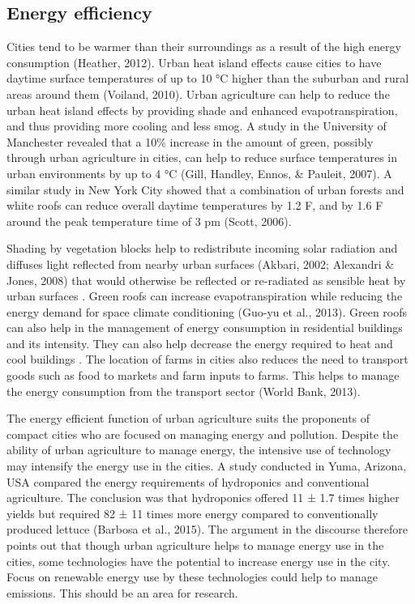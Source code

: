 \subsection{Energy efficiency}

Cities tend to be warmer than their surroundings as a result of the high energy consumption (Heather, 2012). Urban heat island effects cause cities to have daytime surface temperatures of up to 10 °C higher than the suburban and rural areas around them (Voiland, 2010). Urban agriculture can help to reduce the urban heat island effects by providing shade and enhanced evapotranspiration, and thus providing more cooling and less smog. A study in the University of Manchester revealed that a 10\% increase in the amount of green, possibly through urban agriculture in cities, can help to reduce surface temperatures in urban environments by up to 4 °C (Gill, Handley, Ennos, \& Pauleit, 2007). A similar study in New York City showed that a combination of urban forests and white roofs can reduce overall daytime temperatures by 1.2 F, and by 1.6 F around the peak temperature time of 3 pm (Scott, 2006).

Shading by vegetation blocks help to redistribute incoming solar radiation and diffuses light reflected from nearby urban surfaces (Akbari, 2002; Alexandri \& Jones, 2008) that would otherwise be reflected or re-radiated as sensible heat by urban surfaces \cite{RIZWAN2008}. Green roofs can increase evapotranspiration while reducing the energy demand for space climate conditioning (Guo-yu et al., 2013). Green roofs can also help in the management of energy consumption in residential buildings and its intensity. They can also help decrease the energy required to heat and cool buildings \cite{Ackerman2014}. The location of farms in cities also reduces the need to transport goods such as food to markets and farm inputs to farms. This helps to manage the energy consumption from the transport sector (World Bank, 2013).

The energy efficient function of urban agriculture suits the proponents of compact cities who are focused on managing energy and pollution. Despite the ability of urban agriculture to manage energy, the intensive use of technology may intensify the energy use in the cities. A study conducted in Yuma, Arizona, USA compared the energy requirements of hydroponics and conventional agriculture. The conclusion was that hydroponics offered 11 ± 1.7 times higher yields but required 82 ± 11 times more energy compared to conventionally produced lettuce (Barbosa et al., 2015). The argument in the discourse therefore points out that though urban agriculture helps to manage energy use in the cities, some technologies have the potential to increase energy use in the city. Focus on renewable energy use by these technologies could help to manage emissions. This should be an area for research.

